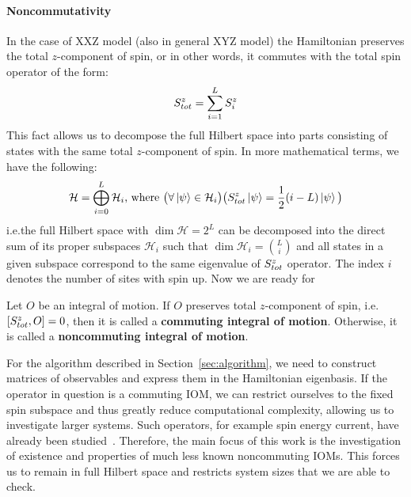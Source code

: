 \paragraph{Noncommutativity}In the case of XXZ model (also in general XYZ model) the Hamiltonian preserves the total \(z\)-component of spin,
or in other words, it commutes with the total spin operator of the form:
\begin{equation*}
  S^{z}_{tot} = \sum_{i = 1}^{L} S^{z}_i
\end{equation*}
This fact allows us to decompose the full Hilbert space into parts consisting of states with the same total \(z\)-component
of spin. In more mathematical terms, we have the following:
\begin{equation*}
  \mathcal{H} = \bigoplus_{i = 0}^{L} \mathcal{H}_i \text{, where } \big(\forall \ket{\psi} \in \mathcal{H}_i \big) \big(S^{z}_{tot} \ket{\psi} = \frac{1}{2}(i-L) \ket{\psi} \big)
\end{equation*}
i.e.\;the full Hilbert space with \(\dim{\mathcal{H}} = 2^L\) can be decomposed into the direct sum of its proper subspaces
\(\mathcal{H}_i\) such that \(\dim{\mathcal{H}_i} = \binom{L}{i}\) and all states in a given subspace correspond to the same
eigenvalue of \(S^{z}_{tot}\) operator. The index \(i\) denotes the number of sites with spin up.
Now we are ready for
\begin{definition}
  Let \(O\) be an integral of motion. If \(O\) preserves total \(z\)-component of spin, i.e.
  \(\comm{\Sz_{tot}}{O} = 0\), then it is called a \textbf{commuting integral of motion}.
  Otherwise, it is called a \textbf{noncommuting integral of motion}.\label{def:noncomm def}
\end{definition}
For the algorithm described in Section~\ref{sec:algorithm}, we need to construct matrices of
observables and express them in the Hamiltonian eigenbasis. If the operator in question is a
commuting IOM, we can restrict ourselves to the fixed spin subspace and thus greatly reduce
computational complexity, allowing us to investigate larger systems. Such operators, for example
spin energy current, have already been studied~\autocite{Mierzejewski2015Approx}. Therefore,
the main focus of this work is the investigation of existence and properties of much less known
noncommuting IOMs. This forces us to remain in full Hilbert space and restricts system sizes
that we are able to check.


